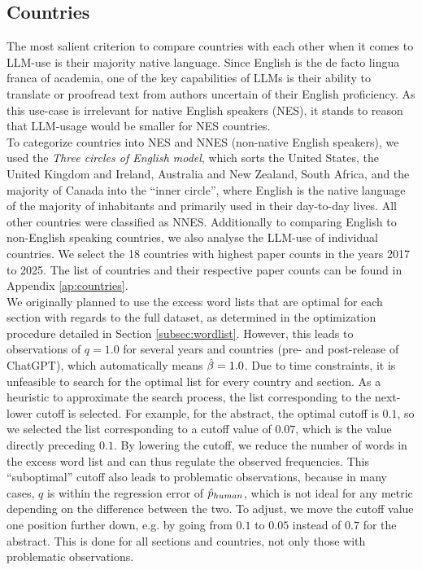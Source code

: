 \subsection{Countries}
The most salient criterion to compare countries with each other when it comes to LLM-use is their majority native language.
Since English is the de facto lingua franca of academia, one of the key capabilities of LLMs is their ability to translate or proofread text from authors uncertain of their English proficiency.
As this use-case is irrelevant for native English speakers (NES), it stands to reason that LLM-usage would be smaller for NES countries.
\\
To categorize countries into NES and NNES (non-native English speakers), we used the \emph{Three circles of English model}\cite{kachru1985standards}, which sorts the United States, the United Kingdom and Ireland, Australia and New Zealand, South Africa, and the majority of Canada into the ``inner circle'', where English is the native language of the majority of inhabitants and primarily used in their day-to-day lives.
All other countries were classified as NNES. 
Additionally to comparing English to non-English speaking countries, we also analyse the LLM-use of individual countries.
We select the 18 countries with highest paper counts in the years 2017 to 2025.
The list of countries and their respective paper counts can be found in Appendix \ref{ap:countries}. 
\\
We originally planned to use the excess word lists that are optimal for each section with regards to the full dataset, as determined in the optimization procedure detailed in Section \ref{subsec:wordlist}. 
However, this leads to observations of $q=1.0$ for several years and countries (pre- and post-release of ChatGPT), which automatically means $\hat{\beta}=1.0$. %
Due to time constraints, it is unfeasible to search for the optimal list for every country and section.
As a heuristic to approximate the search process, the list corresponding to the next-lower cutoff is selected.
For example, for the abstract, the optimal cutoff is $0.1$, so we selected the list corresponding to a cutoff value of $0.07$, which is the value directly preceding $0.1$.
By lowering the cutoff, we reduce the number of words in the excess word list and can thus regulate the observed frequencies.
This ``suboptimal'' cutoff also leads to problematic observations, because in many cases, $q$ is within the regression error of $\hat{p}_{human}$, which is not ideal for any metric depending on the difference between the two.
To adjust, we move the cutoff value one position further down, e.g. by going from $0.1$ to $0.05$ instead of $0.7$ for the abstract.
This is done for all sections and countries, not only those with problematic observations.

